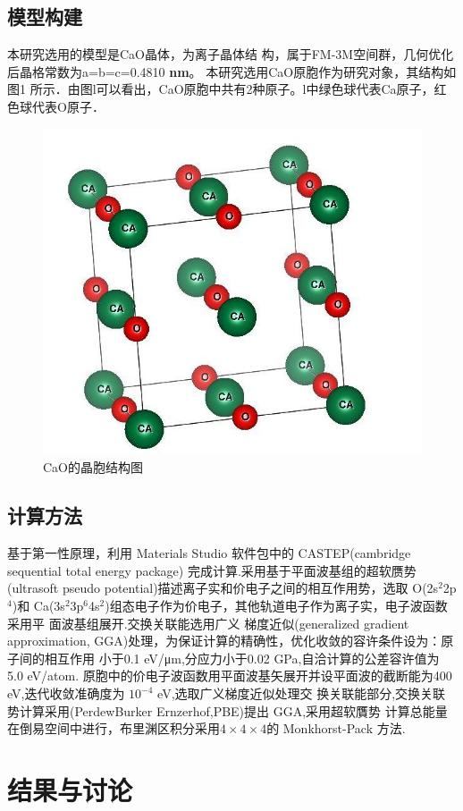 \documentclass[12pt,a4paper]{article}%
\begin{document}
	\subsection{模型构建}
	本研究选用的模型是CaO晶体，为离子晶体结
	构，属于FM-3M空间群，几何优化后晶格常数为a=b=c=0.4810 \textbf{nm}。
	本研究选用CaO原胞作为研究对象，其结构如图1
	所示．由图l可以看出，CaO原胞中共有2种原子。l中绿色球代表Ca原子，红
	色球代表O原子．
	\begin{figure}[H]
		\centering
		\includegraphics[width=0.45\linewidth]{img/CaO}
		\caption[Cao的晶胞结构图]{CaO的晶胞结构图}
		\label{fig:cao}
	\end{figure}
	\subsection{计算方法}
	基于第一性原理，利用 Materials Studio 软件包中的 CASTEP(cambridge sequential total energy package) 完成计算.采用基于平面波基组的超软赝势(ultrasoft pseudo potential)描述离子实和价电子之间的相互作用势，选取 O(2s$^2$2p$^4$)和 Ca(3s$^2$3p$^6$4s$^2$)组态电子作为价电子，其他轨道电子作为离子实，电子波函数采用平
	面波基组展开.交换关联能选用广义 梯度近似(generalized gradient approximation, GGA)处理，为保证计算的精确性，优化收敛的容许条件设为：原子间的相互作用
	小于0.1 eV/μm,分应力小于0.02 GPa,自洽计算的公差容许值为 5.0 eV/atom. 原胞中的价电子波函数用平面波基矢展开并设平面波的截断能为400 eV,迭代收敛准确度为 $10^{-4}$ eV,选取广义梯度近似处理交	
	换关联能部分,交换关联势计算采用(PerdewBurker
	Ernzerhof,PBE)提出 GGA,采用超软贋势
	计算总能量在倒易空间中进行，布里渊区积分采用$4\times4\times4$的  Monkhorst-Pack 方法.
	\section{结果与讨论}
\end{document}

